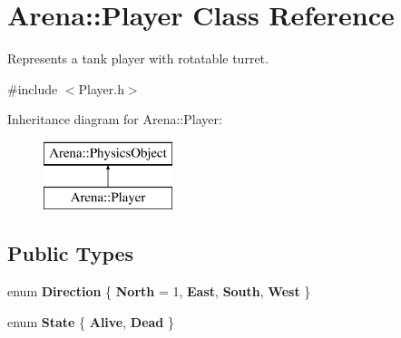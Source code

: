 \hypertarget{class_arena_1_1_player}{\section{Arena\+:\+:Player Class Reference}
\label{class_arena_1_1_player}
}


Represents a tank player with rotatable turret.  




{\ttfamily \#include $<$Player.\+h$>$}

Inheritance diagram for Arena\+:\+:Player\+:\begin{figure}[H]
\begin{center}
\leavevmode
\includegraphics[height=2.000000cm]{class_arena_1_1_player}
\end{center}
\end{figure}
\subsection*{Public Types}
\begin{DoxyCompactItemize}
\item 
\hypertarget{class_arena_1_1_player_a4f0bbae55a9ca69f6766c86af851843b}{enum {\bfseries Direction} \{ {\bfseries North} = 1, 
{\bfseries East}, 
{\bfseries South}, 
{\bfseries West}
 \}}\label{class_arena_1_1_player_a4f0bbae55a9ca69f6766c86af851843b}

\item 
\hypertarget{class_arena_1_1_player_a840d249fa3c4b97afe536126d5b272f6}{enum {\bfseries State} \{ {\bfseries Alive}, 
{\bfseries Dead}
 \}}\label{class_arena_1_1_player_a840d249fa3c4b97afe536126d5b272f6}

\end{DoxyCompactItemize}

